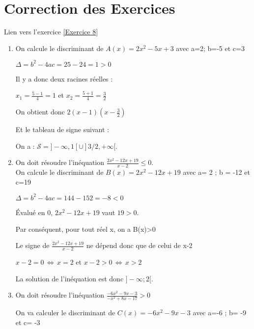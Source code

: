 \documentclass[12pt,fleqn]{report} %
\begin{document}
\setcounter{chapter}{0}

\chapter{Correction des Exercices}
\begin{correction}Lien vers l'exercice   \ref{Exercice 8}
	\begin{enumerate}
		\item {On calcule le discriminant de $A(x)=2x^2-5x+3$ avec a=2; b=-5 et c=3
			
			$
			\Delta = b^2-4ac = 25-24=1>0
			$
			
			Il y a donc deux racines réelles :
			
			$x_1=\frac{5-1}{4}=1$ et $x_2=\frac{5+1}{4}=\frac{3}{2}$
			
			On obtient donc $2(x-1)(x-\frac{3}{2})$
			
			Et le tableau de signe suivant :
		}
		
		\begin{center} 
		\end{center}
		On a : $\mathcal{S} = ]-\infty,1[ \cup ]3/2,+\infty[$.
		\item On doit résoudre l’inéquation $\frac{2x^2-12x+19}{x-2}\leq0$. \\
		On calcule le discriminant de $B(x) = 2x^2-12x+19$ avec a= 2 ; b = -12 et c=19
		
		$
		\Delta = b^2-4ac=144-152=-8<0
		$
		
		\'Evalué en 0, $2x^2 -12x + 19$ vaut $19>0$.
		
		Par conséquent, pour tout réel x, on a B(x)>0
		
		Le signe de $\frac{2x^2-12x+19}{x-2}$ ne dépend donc que de celui de x-2
		
		$x-2=0 \, \iff \, x=2$  et  $x-2>0 \, \iff \, x>2$
		
		La solution de l'inéquation est donc $]-\infty;2[$.
		\item {On doit résoudre l’inéquation $\frac{-6x^2-9x-3}{-x^2+8x-17}>0$
			
			On va calculer le discriminant de $C(x)=-6x^2-9x-3$ avec a=-6 ; b= -9 et c= -3
			
}
\end{enumerate}
\end{correction}
\end{document}
